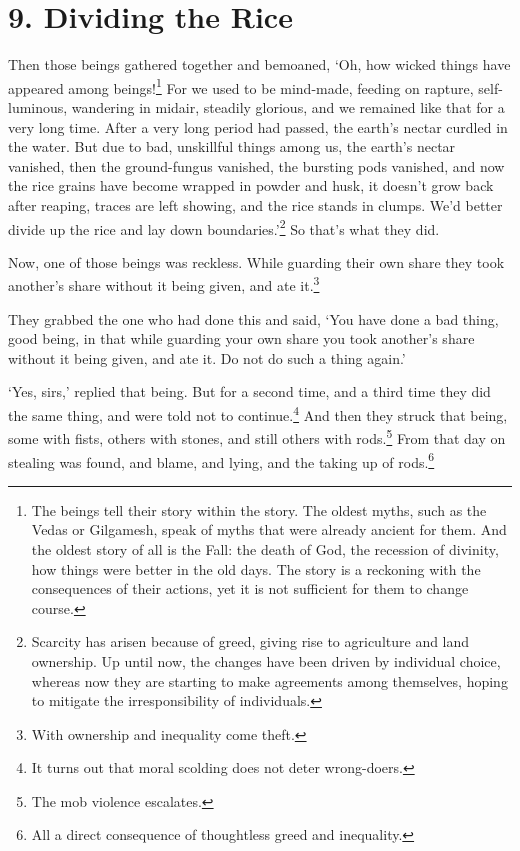 \documentclass[12pt,openany]{book}%
\begin{document}
\section*{9. Dividing the Rice }

Then those beings gathered together and bemoaned, ‘Oh, how wicked things have appeared among beings!\footnote{The beings tell their story within the story. The oldest myths, such as the Vedas or Gilgamesh, speak of myths that were already ancient for them. And the oldest story of all is the Fall: the death of God, the recession of divinity, how things were better in the old days. The story is a reckoning with the consequences of their actions, yet it is not sufficient for them to change course. } For we used to be mind-made, feeding on rapture, self-luminous, wandering in midair, steadily glorious, and we remained like that for a very long time. After a very long period had passed, the earth’s nectar curdled in the water. But due to bad, unskillful things among us, the earth’s nectar vanished, then the ground-fungus vanished, the bursting pods vanished, and now the rice grains have become wrapped in powder and husk, it doesn’t grow back after reaping, traces are left showing, and the rice stands in clumps. We’d better divide up the rice and lay down boundaries.’\footnote{Scarcity has arisen because of greed, giving rise to agriculture and land ownership. Up until now, the changes have been driven by individual choice, whereas now they are starting to make agreements among themselves, hoping to mitigate the irresponsibility of individuals. } So that’s what they did. 

Now, one of those beings was reckless. While guarding their own share they took another’s share without it being given, and ate it.\footnote{With ownership and inequality come theft. } 

They grabbed the one who had done this and said, ‘You have done a bad thing, good being, in that while guarding your own share you took another’s share without it being given, and ate it. Do not do such a thing again.’ 

‘Yes, sirs,’ replied that being. But for a second time, and a third time they did the same thing, and were told not to continue.\footnote{It turns out that moral scolding does not deter wrong-doers. } And then they struck that being, some with fists, others with stones, and still others with rods.\footnote{The mob violence escalates. } From that day on stealing was found, and blame, and lying, and the taking up of rods.\footnote{All a direct consequence of thoughtless greed and inequality. } 
\end{document}
